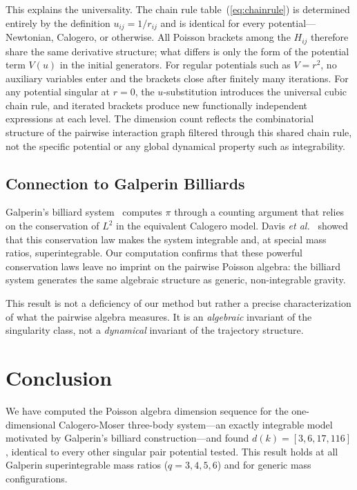 \documentclass[aps,prl,twocolumn,superscriptaddress,showpacs]{revtex4-2}
\begin{document}
This explains the universality.  The chain rule
table~(\ref{eq:chainrule}) is determined entirely by the definition
$u_{ij} = 1/r_{ij}$ and is identical for every potential---Newtonian,
Calogero, or otherwise.  All Poisson brackets among the $H_{ij}$
therefore share the same derivative structure; what differs is only
the form of the potential term $V(u)$ in the initial generators.
For regular potentials such as $V = r^2$, no auxiliary variables
enter and the brackets close after finitely many iterations.  For
any potential singular at $r = 0$, the $u$-substitution introduces
the universal cubic chain rule, and iterated brackets produce new
functionally independent expressions at each level.  The dimension
count reflects the combinatorial structure of the pairwise
interaction graph filtered through this shared chain rule, not the
specific potential or any global dynamical property such as
integrability.

\subsection{Connection to Galperin Billiards}

Galperin's billiard system~\cite{Galperin2003} computes $\pi$ through
a counting argument that relies on the conservation of $L^2$ in the
equivalent Calogero model.  Davis \textit{et al.}~\cite{Davis2017}
showed that this conservation law makes the system integrable and,
at special mass ratios, superintegrable.  Our computation confirms
that these powerful conservation laws leave no imprint on the pairwise
Poisson algebra: the billiard system generates the same algebraic
structure as generic, non-integrable gravity.

This result is not a deficiency of our method but rather a precise
characterization of what the pairwise algebra measures.  It is an
\emph{algebraic} invariant of the singularity class, not a
\emph{dynamical} invariant of the trajectory structure.


\section{Conclusion}
\label{sec:conclusion}

We have computed the Poisson algebra dimension sequence for the
one-dimensional Calogero-Moser three-body system---an exactly
integrable model motivated by Galperin's billiard construction---and
found $d(k) = [3, 6, 17, 116]$, identical to every other singular
pair potential tested.  This result holds at all Galperin
superintegrable mass ratios ($q = 3, 4, 5, 6$) and for generic mass
configurations.
\end{document}

